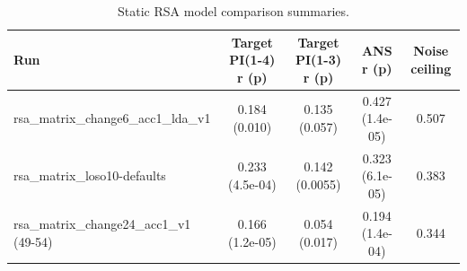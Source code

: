 \begin{table}[ht]
  \centering
  \small
  \caption{Static RSA model comparison summaries.}
  \label{tab:model-comparison}
  \begin{tabular}{lcccc}
    \toprule
    Run & Target PI(1-4) r (p) & Target PI(1-3) r (p) & ANS r (p) & Noise ceiling \\
    \midrule
    rsa\_matrix\_change6\_acc1\_lda\_v1 & 0.184 (0.010) & 0.135 (0.057) & 0.427 (1.4e-05) & 0.507 \\
    rsa\_matrix\_loso10-defaults & 0.233 (4.5e-04) & 0.142 (0.0055) & 0.323 (6.1e-05) & 0.383 \\
    rsa\_matrix\_change24\_acc1\_v1 (49-54) & 0.166 (1.2e-05) & 0.054 (0.017) & 0.194 (1.4e-04) & 0.344 \\
    \bottomrule
  \end{tabular}
\end{table}
